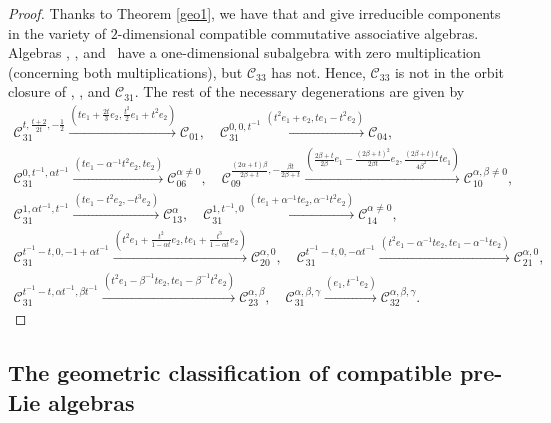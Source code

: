 \documentclass[10pt,a4paper]{amsart}
\numberwithin{equation}{section}
\begin{document}
\begin{proof}
Thanks to Theorem \ref{geo1}, we have that
 and  give irreducible components in the variety of $2$-dimensional compatible commutative associative algebras.
Algebras ,
, and~ have a one-dimensional subalgebra with zero multiplication (concerning both multiplications), but $\mathcal{C}_{33}$ has not.
Hence, $\mathcal{C}_{33}$ is not in the orbit closure of ,
, and $\mathcal{C}_{31}.$
The rest of the necessary degenerations are given by
\begin{gather*}
 \mathcal{C}_{31}^{t, \frac{t+2}{2t}, -\frac{1}{2}} \xrightarrow{ ( te_1+\frac{2 t}{3}e_2, \frac{t^2}{2}e_1+t^2e_2)} \mathcal{C}_{01} , \quad
 \mathcal{C}_{31}^{0, 0, t^{-1}} \xrightarrow{ ( t^2e_1+e_2, te_1-t^2e_2)} \mathcal{C}_{04} , \\
 \mathcal{C}_{31}^{0, t^{-1}, \alpha t^{-1}} \xrightarrow{ ( te_1-\alpha^{-1}t^2e_2, te_2)} \mathcal{C}_{06}^{\alpha\neq0} , \quad
 \mathcal{C}_{09}^{\frac{(2\alpha+t)\beta}{2\beta+t},-\frac{\beta t}{2\beta+t}} \xrightarrow{ ( \frac{2\beta +t}{2\beta}e_1-\frac{(2\beta +t)^2}{2\beta t}e_2, \frac{(2\beta+t)t}{4\beta^2}te_1)} \mathcal{C}_{10}^{\alpha,\beta\neq0} ,\\
 \mathcal{C}_{31}^{1, \alpha t^{-1}, t^{-1}} \xrightarrow{ ( te_1-t^2e_2, -t^3e_2)} \mathcal{C}_{13}^{\alpha} , \quad
 \mathcal{C}_{31}^{1, t^{-1}, 0} \xrightarrow{ (te_1+\alpha^{-1} t e_2, \alpha^{-1}t^2 e_2)} \mathcal{C}_{14}^{\alpha\neq0} , \\
 \mathcal{C}_{31}^{t^{-1}-t, 0, -1+\alpha t^{-1}} \xrightarrow{ (t^2e_1+\frac{t^2}{1-\alpha t} e_2, t e_1+\frac{t^3}{1-\alpha t} e_2)} \mathcal{C}_{20}^{\alpha,0} ,\quad
 \mathcal{C}_{31}^{t^{-1}-t, 0, -\alpha t^{-1}} \xrightarrow{ (t^2e_1-\alpha^{-1} t e_2, t e_1- \alpha^{-1} t e_2)} \mathcal{C}_{21}^{\alpha,0} , \\
 \mathcal{C}_{31}^{t^{-1}-t, \alpha t^{-1}, \beta t^{-1}} \xrightarrow{ (t^2e_1-\beta^{-1} t e_2, t e_1- \beta^{-1} t^2 e_2)} \mathcal{C}_{23}^{\alpha,\beta} , \quad
 \mathcal{C}_{31}^{\alpha, \beta, \gamma} \xrightarrow{ ( e_1, t^{-1}e_2)} \mathcal{C}_{32}^{\alpha, \beta, \gamma}. \tag*{\qed}
\end{gather*}\renewcommand{\qed}{}
\end{proof}

\subsection{The geometric classification of compatible pre-Lie algebras}
\end{document}
